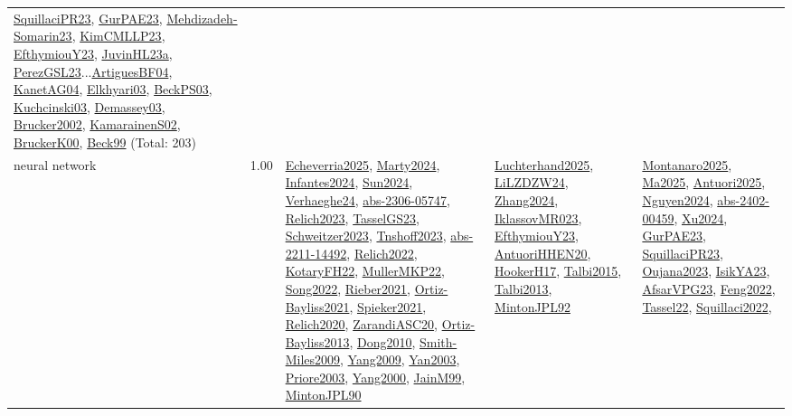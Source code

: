 {\begin{longtable}{p{3cm}r>{\raggedright\arraybackslash}p{6cm}>{\raggedright\arraybackslash}p{6cm}>{\raggedright\arraybackslash}p{8cm}}
\hyperref[detail:SquillaciPR23]{SquillaciPR23}, \hyperref[detail:GurPAE23]{GurPAE23}, \hyperref[detail:Mehdizadeh-Somarin23]{Mehdizadeh-Somarin23}, \hyperref[detail:KimCMLLP23]{KimCMLLP23}, \hyperref[detail:EfthymiouY23]{EfthymiouY23}, \hyperref[detail:JuvinHL23a]{JuvinHL23a}, \hyperref[detail:PerezGSL23]{PerezGSL23}...\hyperref[detail:ArtiguesBF04]{ArtiguesBF04}, \hyperref[detail:KanetAG04]{KanetAG04}, \hyperref[detail:Elkhyari03]{Elkhyari03}, \hyperref[detail:BeckPS03]{BeckPS03}, \hyperref[detail:Kuchcinski03]{Kuchcinski03}, \hyperref[detail:Demassey03]{Demassey03}, \hyperref[detail:Brucker2002]{Brucker2002}, \hyperref[detail:KamarainenS02]{KamarainenS02}, \hyperref[detail:BruckerK00]{BruckerK00}, \hyperref[detail:Beck99]{Beck99} (Total: 203)\\
\index{neural network}\index{Algorithms!neural network}neural network &  1.00 & \hyperref[detail:Echeverria2025]{Echeverria2025}, \hyperref[detail:Marty2024]{Marty2024}, \hyperref[detail:Infantes2024]{Infantes2024}, \hyperref[detail:Sun2024]{Sun2024}, \hyperref[detail:Verhaeghe24]{Verhaeghe24}, \hyperref[detail:abs-2306-05747]{abs-2306-05747}, \hyperref[detail:Relich2023]{Relich2023}, \hyperref[detail:TasselGS23]{TasselGS23}, \hyperref[detail:Schweitzer2023]{Schweitzer2023}, \hyperref[detail:Tnshoff2023]{Tnshoff2023}, \hyperref[detail:abs-2211-14492]{abs-2211-14492}, \hyperref[detail:Relich2022]{Relich2022}, \hyperref[detail:KotaryFH22]{KotaryFH22}, \hyperref[detail:MullerMKP22]{MullerMKP22}, \hyperref[detail:Song2022]{Song2022}, \hyperref[detail:Rieber2021]{Rieber2021}, \hyperref[detail:Ortiz-Bayliss2021]{Ortiz-Bayliss2021}, \hyperref[detail:Spieker2021]{Spieker2021}, \hyperref[detail:Relich2020]{Relich2020}, \hyperref[detail:ZarandiASC20]{ZarandiASC20}, \hyperref[detail:Ortiz-Bayliss2013]{Ortiz-Bayliss2013}, \hyperref[detail:Dong2010]{Dong2010}, \hyperref[detail:Smith-Miles2009]{Smith-Miles2009}, \hyperref[detail:Yang2009]{Yang2009}, \hyperref[detail:Yan2003]{Yan2003}, \hyperref[detail:Priore2003]{Priore2003}, \hyperref[detail:Yang2000]{Yang2000}, \hyperref[detail:JainM99]{JainM99}, \hyperref[detail:MintonJPL90]{MintonJPL90} & \hyperref[detail:Luchterhand2025]{Luchterhand2025}, \hyperref[detail:LiLZDZW24]{LiLZDZW24}, \hyperref[detail:Zhang2024]{Zhang2024}, \hyperref[detail:IklassovMR023]{IklassovMR023}, \hyperref[detail:EfthymiouY23]{EfthymiouY23}, \hyperref[detail:AntuoriHHEN20]{AntuoriHHEN20}, \hyperref[detail:HookerH17]{HookerH17}, \hyperref[detail:Talbi2015]{Talbi2015}, \hyperref[detail:Talbi2013]{Talbi2013}, \hyperref[detail:MintonJPL92]{MintonJPL92} & \hyperref[detail:Montanaro2025]{Montanaro2025}, \hyperref[detail:Ma2025]{Ma2025}, \hyperref[detail:Antuori2025]{Antuori2025}, \hyperref[detail:Nguyen2024]{Nguyen2024}, \hyperref[detail:abs-2402-00459]{abs-2402-00459}, \hyperref[detail:Xu2024]{Xu2024}, \hyperref[detail:GurPAE23]{GurPAE23}, \hyperref[detail:SquillaciPR23]{SquillaciPR23}, \hyperref[detail:Oujana2023]{Oujana2023}, \hyperref[detail:IsikYA23]{IsikYA23}, \hyperref[detail:AfsarVPG23]{AfsarVPG23}, \hyperref[detail:Feng2022]{Feng2022}, \hyperref[detail:Tassel22]{Tassel22}, \hyperref[detail:Squillaci2022]{Squillaci2022}, 
\end{longtable}}
